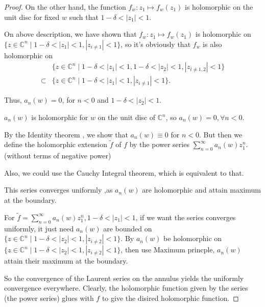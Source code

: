 \begin{proof}
    On the other hand, the function $f_w\colon z_1\mapsto f_w(z_1)$ is holomorphic on the unit disc for fixed $w$ such that $1-\delta<|z_1|<1$. 
    \begin{remark}
        On above description, we have shown that $f_w\colon z_1\mapsto f_w(z_1)$ is holomorphic on $\{z\in\mathbb{C}^n\mid 1-\delta<|z_1|<1,|z_{i\neq 1}|<1\}$, so it's obviously that $f_w$ is also holomorphic on 
        \begin{align*}
        &\{z\in\mathbb{C}^n\mid 1-\delta<|z_1|<1,1-\delta<|z_2|<1,|z_{i\neq 1,2}|<1\}\\
        \subset &\{z\in\mathbb{C}^n\mid 1-\delta<|z_1|<1,|z_{i\neq 1}|<1\}.
        \end{align*}
    \end{remark}
    Thus, $a_n (w)=0$, for $n<0$ and $1-\delta<|z_2|<1$. 
    \begin{remark}
        $a_n(w)$ is holomorphic for $w$ on the unit disc of $\mathbb{C}^n$, so $a_n (w)=0, \forall n<0$. 
    \end{remark}
    By the Identity theorem , we show that $a_n(w)\equiv 0$ for $n<0$. But then we define the holomorphic extension $\widetilde{f}$ of $f$ by the power series $\sum_{n=0}^{\infty}a_n (w)z_1^n$. (without terms of negative power)
    \begin{remark}
        Also, we could use the Cauchy Integral theorem, which is equivalent to that.
    \end{remark}
    This series converges uniformly ,as $a_n (w)$ are holomorphic and attain maximum at the boundary. 
    \begin{remark}
        For $\widetilde{f}=\sum_{n=0}^{\infty}a_n(w)z_1^n, 1-\delta<|z_1|<1$, if we want the series converges uniformly, it just need $a_n(w)$ are bounded on $\{z\in\mathbb{C}^n\mid 1-\delta<|z_2|<1,|z_{i\neq 2}|<1\}$. By $a_n(w)$ be holomorphic on $\{z\in\mathbb{C}^n\mid 1-\delta<|z_2|<1,|z_{i\neq 2}|<1\}$, then use Maximum princple, $a_n(w)$ attain their maximum at the boundary.
        \end{remark}
        So the convergence of the Laurent series on the annulus yields the uniformly convergence everywhere. Clearly, the holomorphic function given by the series (the power series) glues with $f$ to give the disired holomorphic function.
\end{proof}













